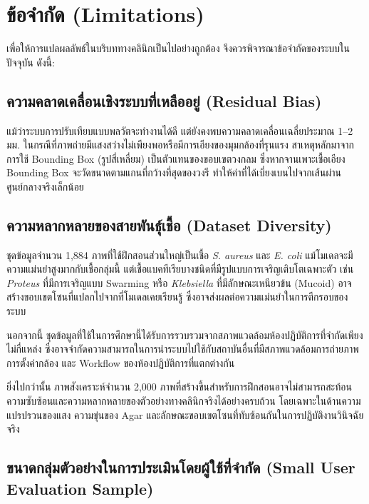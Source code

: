 \section{ข้อจำกัด (Limitations)}
\label{sec:limitations}

เพื่อให้การแปลผลลัพธ์ในบริบททางคลินิกเป็นไปอย่างถูกต้อง จึงควรพิจารณาข้อจำกัดของระบบในปัจจุบัน ดังนี้:

\subsection{ความคลาดเคลื่อนเชิงระบบที่เหลืออยู่ (Residual Bias)}

แม้ว่าระบบการปรับเทียบแบบพลวัตจะทำงานได้ดี แต่ยังคงพบความคลาดเคลื่อนเฉลี่ยประมาณ 1--2 มม. ในกรณีที่ภาพถ่ายมีแสงสว่างไม่เพียงพอหรือมีการเอียงของมุมกล้องที่รุนแรง สาเหตุหลักมาจากการใช้ Bounding Box (รูปสี่เหลี่ยม) เป็นตัวแทนของขอบเขตวงกลม ซึ่งหากจานเพาะเชื้อเอียง Bounding Box จะวัดขนาดตามแกนที่กว้างที่สุดของวงรี ทำให้ค่าที่ได้เบี่ยงเบนไปจากเส้นผ่านศูนย์กลางจริงเล็กน้อย

\subsection{ความหลากหลายของสายพันธุ์เชื้อ (Dataset Diversity)}

ชุดข้อมูลจำนวน 1,884 ภาพที่ใช้ฝึกสอนส่วนใหญ่เป็นเชื้อ \textit{S. aureus} และ \textit{E. coli} แม้โมเดลจะมีความแม่นยำสูงมากกับเชื้อกลุ่มนี้ แต่เชื้อแบคทีเรียบางชนิดที่มีรูปแบบการเจริญเติบโตเฉพาะตัว เช่น \textit{Proteus} ที่มีการเจริญแบบ Swarming หรือ \textit{Klebsiella} ที่มีลักษณะเหนียวข้น (Mucoid) อาจสร้างขอบเขตโซนที่แปลกไปจากที่โมเดลเคยเรียนรู้ ซึ่งอาจส่งผลต่อความแม่นยำในการตีกรอบของระบบ

นอกจากนี้ ชุดข้อมูลที่ใช้ในการศึกษานี้ได้รับการรวบรวมจากสภาพแวดล้อมห้องปฏิบัติการที่จำกัดเพียงไม่กี่แหล่ง ซึ่งอาจจำกัดความสามารถในการนำระบบไปใช้กับสถาบันอื่นที่มีสภาพแวดล้อมการถ่ายภาพ การตั้งค่ากล้อง และ Workflow ของห้องปฏิบัติการที่แตกต่างกัน

ยิ่งไปกว่านั้น ภาพสังเคราะห์จำนวน 2,000 ภาพที่สร้างขึ้นสำหรับการฝึกสอนอาจไม่สามารถสะท้อนความซับซ้อนและความหลากหลายของตัวอย่างทางคลินิกจริงได้อย่างครบถ้วน โดยเฉพาะในด้านความแปรปรวนของแสง ความขุ่นของ Agar และลักษณะขอบเขตโซนที่ทับซ้อนกันในการปฏิบัติงานวินิจฉัยจริง

\subsection{ขนาดกลุ่มตัวอย่างในการประเมินโดยผู้ใช้ที่จำกัด (Small User Evaluation Sample)}

